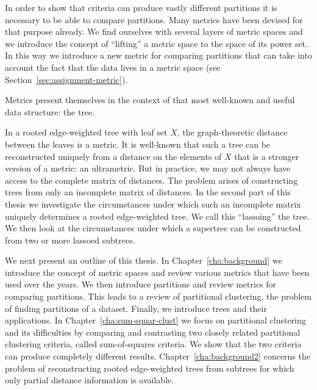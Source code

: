In order to show that criteria can produce vastly different partitions it is
necessary to be able to compare partitions.  Many metrics have been devised
for that purpose already.  We find ourselves with several layers of metric
spaces and we introduce the concept of ``lifting'' a metric space to the space
of its power set.  In this way we introduce a new metric for comparing
partitions that can take into account the fact that the data lives in a metric
space (see Section~\ref{sec:assignment-metric}).

Metrics present themselves in the context of that most well-known and useful
data structure: the tree.

In a rooted edge-weighted tree with leaf set $X$, the graph-theoretic distance
between the leaves is a metric.  It is well-known that such a tree can be
reconstructed uniquely from a distance on the elements of $X$ that is a
stronger version of a metric: an ultrametric.  But in practice, we may not
always have access to the complete matrix of distances.  The problem arises of
constructing trees from only an incomplete matrix of distances.  In the second
part of this thesis we investigate the circumstances under which such an
incomplete matrix uniquely determines a rooted edge-weighted tree.  We call
this ``lassoing'' the tree.  We then look at the circumstances under which a
supertree can be constructed from two or more lassoed subtrees.

We next present an outline of this thesis. In Chapter~\ref{cha:background} we
introduce the concept of metric spaces and review various metrics that have
been used over the years.  We then introduce partitions and review metrics for
comparing partitions.  This leads to a review of partitional clustering, the
problem of finding partitions of a dataset.  Finally, we introduce trees and
their applications.  In Chapter~\ref{cha:sum-squar-clust} we focus on
partitional clustering and its difficulties by comparing and contrasting two
closely related partitional clustering criteria, called sum-of-squares
criteria.  We show that the two criteria can produce completely different
results.  Chapter~\ref{cha:background2} concerns the problem of
reconstructing rooted edge-weighted trees from subtrees for which only partial
distance information is available.


